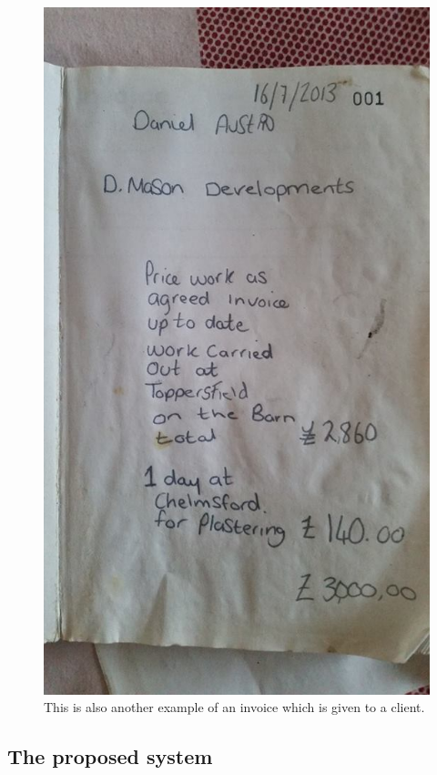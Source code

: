 \begin{figure}[H]
    \includegraphics[width=\textwidth]{./Analysis/images/invoice3.jpg}
    \caption{This is also another example of an invoice which is given to a client.} \label{fig:invoice}
\end{figure}

\subsection{The proposed system}

